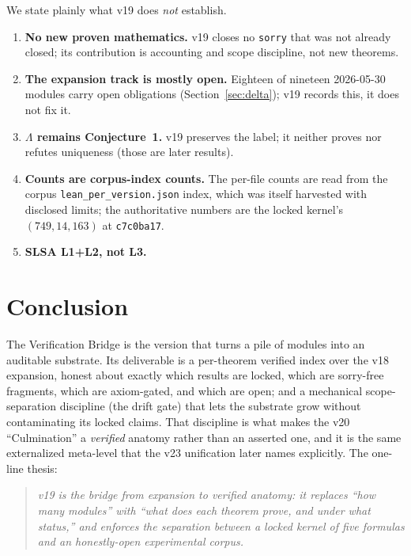 \documentclass[11pt]{article}
\theoremstyle{plain}
\theoremstyle{definition}
\theoremstyle{remark}
\newcommand{\La}{\Lambda}
\begin{document}
We state plainly what v19 does \emph{not} establish.
\begin{enumerate}[leftmargin=2em,itemsep=2pt]
  \item \textbf{No new proven mathematics.} v19 closes no \texttt{sorry} that was not
    already closed; its contribution is accounting and scope discipline, not new theorems.
  \item \textbf{The expansion track is mostly open.} Eighteen of nineteen 2026-05-30
    modules carry open obligations (Section~\ref{sec:delta}); v19 records this, it does
    not fix it.
  \item \textbf{$\La$ remains Conjecture~1.} v19 preserves the label; it neither proves
    nor refutes uniqueness (those are later results).
  \item \textbf{Counts are corpus-index counts.} The per-file counts are read from the
    corpus \texttt{lean\_per\_version.json} index, which was itself harvested with
    disclosed limits; the authoritative numbers are the locked kernel's
    $(749,14,163)$ at \texttt{c7c0ba17}.
  \item \textbf{SLSA L1+L2, not L3.}
\end{enumerate}

\section{Conclusion}
\label{sec:conclusion}

The Verification Bridge is the version that turns a pile of modules into an auditable
substrate. Its deliverable is a per-theorem verified index over the v18 expansion,
honest about exactly which results are locked, which are sorry-free fragments, which
are axiom-gated, and which are open; and a mechanical scope-separation discipline (the
drift gate) that lets the substrate grow without contaminating its locked claims. That
discipline is what makes the v20 ``Culmination'' a \emph{verified} anatomy rather than
an asserted one, and it is the same externalized meta-level that the v23 unification
later names explicitly. The one-line thesis:
\begin{quote}\itshape
v19 is the bridge from expansion to verified anatomy: it replaces ``how many modules''
with ``what does each theorem prove, and under what status,'' and enforces the
separation between a locked kernel of five formulas and an honestly-open experimental
corpus.
\end{quote}
\end{document}
